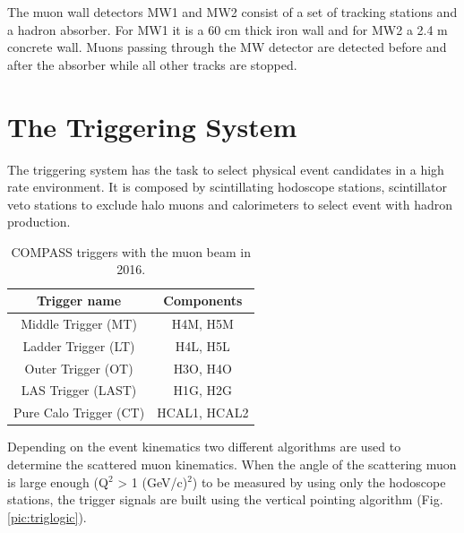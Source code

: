 The muon wall detectors MW1 and MW2 consist of a set of tracking stations and a hadron absorber. For MW1 it is a 60 cm thick iron wall and for MW2 a 2.4 m concrete wall.
Muons passing through the MW detector are detected before and after the absorber while all other tracks are stopped.


\section{The Triggering System}\label{sec:trigger}

The triggering system \cite{} has the task to select physical event candidates in a high rate environment. It is composed by scintillating hodoscope stations, scintillator veto stations to exclude halo muons and calorimeters to select event with hadron production.

\begin{table}[!h]
  \caption{COMPASS triggers with the muon beam in 2016.}
  \label{tab:kinvar}
  \centering
  \begin{tabularx}{7.5cm}{cc}
    \hline
    \hline
    Trigger name & Components \\
    \hline
    \hline
    Middle Trigger (MT) & H4M, H5M \\
    Ladder Trigger (LT) & H4L, H5L \\
    Outer Trigger (OT) & H3O, H4O \\
    LAS Trigger (LAST) & H1G, H2G \\
    Pure Calo Trigger (CT) & HCAL1, HCAL2 \\
    \hline
    \hline
  \end{tabularx}
\end{table}

Depending on the event kinematics two different algorithms are used to determine the scattered muon kinematics. When the angle of the scattering muon is large enough (Q$^2$ > 1 (GeV/c)$^2$) to be measured by using only the hodoscope stations, the trigger signals are built using the vertical pointing algorithm (Fig. \ref{pic:triglogic}).

